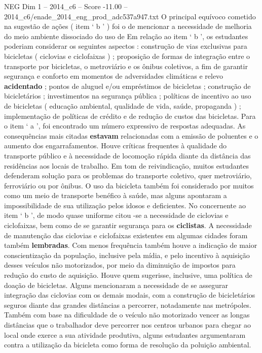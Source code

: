 \begin{textsample}{NEG Dim 1 – 2014\_c6 – Score -11.00 – 2014\_c6/enade\_2014\_eng\_prod\_adc537a947.txt}
O principal equívoco cometido na sugestão de ações ( item ‘ b ’ ) foi o de mencionar a necessidade de melhoria do meio ambiente dissociado do uso de Em relação ao item ‘ b ’, os estudantes poderiam considerar os seguintes aspectos : construção de vias exclusivas para bicicletas ( ciclovias e ciclofaixas ) ; proposição de formas de integração entre o transporte por bicicletas, o metroviário e os ônibus coletivos, a fim de garantir segurança e conforto em momentos de adversidades climáticas e relevo \textbf{acidentado} ; pontos de aluguel e/ou empréstimos de bicicletas ; construção de bicicletários ; investimentos na segurança pública ; políticas de incentivo ao uso de bicicletas ( educação ambiental, qualidade de vida, saúde, propaganda ) ; implementação de políticas de crédito e de redução de custos das bicicletas.
Para o item ‘ a ’, foi encontrado um número expressivo de respostas adequadas.
As consequências mais citadas \textbf{estavam} relacionadas com a emissão de poluentes e o aumento dos engarrafamentos.
Houve críticas frequentes à qualidade do transporte público e à necessidade de locomoção rápida diante da distância das residências aos locais de trabalho.
Em tom de reivindicação, muitos estudantes defenderam solução para os problemas do transporte coletivo, quer metroviário, ferroviário ou por ônibus.
O uso da bicicleta também foi considerado por muitos como um meio de transporte benéfico à saúde, mas alguns apontaram a impossibilidade de sua utilização pelos idosos e deficientes.
No concernente ao item ‘ b ’, de modo quase uniforme citou -se a necessidade de ciclovias e ciclofaixas, bem como de se garantir segurança para os \textbf{ciclistas}.
A necessidade de manutenção das ciclovias e ciclofaixas existentes em algumas cidades foram também \textbf{lembradas}.
Com menos frequência também houve a indicação de maior conscientização da população, inclusive pela mídia, e pelo incentivo à aquisição desses veículos não motorizados, por meio da diminuição de impostos para redução do custo de aquisição.
Houve quem sugerisse, inclusive, uma política de doação de bicicletas.
Alguns mencionaram a necessidade de se assegurar integração das ciclovias com os demais modais, com a construção de bicicletários seguros diante das grandes distâncias a percorrer, notadamente nas metrópoles.
Também com base na dificuldade de o veículo não motorizado vencer as longas distâncias que o trabalhador deve percorrer nos centros urbanos para chegar ao local onde exerce a sua atividade produtiva, alguns estudantes argumentaram contra a utilização da bicicleta como forma de resolução da poluição ambiental.

\end{textsample}

